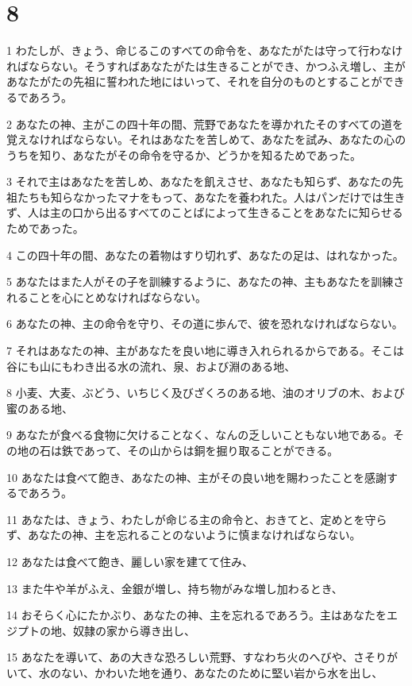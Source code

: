 \chapter{8}

\par 1 わたしが、きょう、命じるこのすべての命令を、あなたがたは守って行わなければならない。そうすればあなたがたは生きることができ、かつふえ増し、主があなたがたの先祖に誓われた地にはいって、それを自分のものとすることができるであろう。
\par 2 あなたの神、主がこの四十年の間、荒野であなたを導かれたそのすべての道を覚えなければならない。それはあなたを苦しめて、あなたを試み、あなたの心のうちを知り、あなたがその命令を守るか、どうかを知るためであった。
\par 3 それで主はあなたを苦しめ、あなたを飢えさせ、あなたも知らず、あなたの先祖たちも知らなかったマナをもって、あなたを養われた。人はパンだけでは生きず、人は主の口から出るすべてのことばによって生きることをあなたに知らせるためであった。
\par 4 この四十年の間、あなたの着物はすり切れず、あなたの足は、はれなかった。
\par 5 あなたはまた人がその子を訓練するように、あなたの神、主もあなたを訓練されることを心にとめなければならない。
\par 6 あなたの神、主の命令を守り、その道に歩んで、彼を恐れなければならない。
\par 7 それはあなたの神、主があなたを良い地に導き入れられるからである。そこは谷にも山にもわき出る水の流れ、泉、および淵のある地、
\par 8 小麦、大麦、ぶどう、いちじく及びざくろのある地、油のオリブの木、および蜜のある地、
\par 9 あなたが食べる食物に欠けることなく、なんの乏しいこともない地である。その地の石は鉄であって、その山からは銅を掘り取ることができる。
\par 10 あなたは食べて飽き、あなたの神、主がその良い地を賜わったことを感謝するであろう。
\par 11 あなたは、きょう、わたしが命じる主の命令と、おきてと、定めとを守らず、あなたの神、主を忘れることのないように慎まなければならない。
\par 12 あなたは食べて飽き、麗しい家を建てて住み、
\par 13 また牛や羊がふえ、金銀が増し、持ち物がみな増し加わるとき、
\par 14 おそらく心にたかぶり、あなたの神、主を忘れるであろう。主はあなたをエジプトの地、奴隷の家から導き出し、
\par 15 あなたを導いて、あの大きな恐ろしい荒野、すなわち火のへびや、さそりがいて、水のない、かわいた地を通り、あなたのために堅い岩から水を出し、
